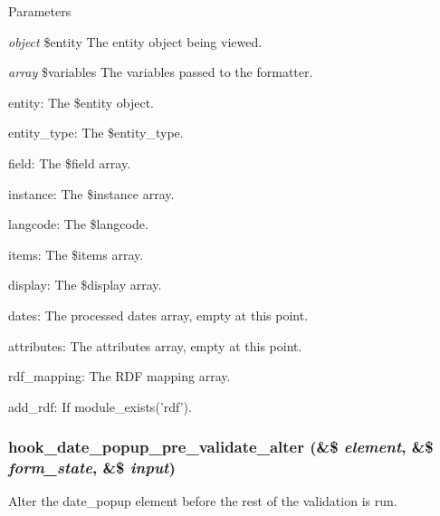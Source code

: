 \begin{DoxyParams}{Parameters}
\item[{\em object}]\$entity The entity object being viewed. \item[{\em array}]\$variables The variables passed to the formatter.
\begin{DoxyItemize}
\item entity: The \$entity object.
\item entity\_\-type: The \$entity\_\-type.
\item field: The \$field array.
\item instance: The \$instance array.
\item langcode: The \$langcode.
\item items: The \$items array.
\item display: The \$display array.
\item dates: The processed dates array, empty at this point.
\item attributes: The attributes array, empty at this point.
\item rdf\_\-mapping: The RDF mapping array.
\item add\_\-rdf: If module\_\-exists('rdf'). 
\end{DoxyItemize}\end{DoxyParams}
\hypertarget{date_8api_8php_ae85363c63f938c6742a67b315e925730}{
\subsubsection[{hook\_\-date\_\-popup\_\-pre\_\-validate\_\-alter}]{\setlength{\rightskip}{0pt plus 5cm}hook\_\-date\_\-popup\_\-pre\_\-validate\_\-alter (\&\$ {\em element}, \/  \&\$ {\em form\_\-state}, \/  \&\$ {\em input})}}
\label{date_8api_8php_ae85363c63f938c6742a67b315e925730}
Alter the date\_\-popup element before the rest of the validation is run.


